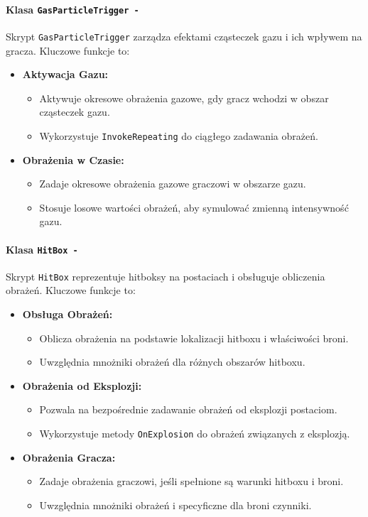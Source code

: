 \paragraph{Klasa \texttt{GasParticleTrigger -}}
Skrypt \texttt{GasParticleTrigger} zarządza efektami cząsteczek gazu i ich wpływem na gracza. Kluczowe funkcje to:
\begin{itemize}
\item \textbf{Aktywacja Gazu:}
    \begin{itemize}
        \item Aktywuje okresowe obrażenia gazowe, gdy gracz wchodzi w obszar cząsteczek gazu.
        \item Wykorzystuje \texttt{InvokeRepeating} do ciągłego zadawania obrażeń.
    \end{itemize}
\item \textbf{Obrażenia w Czasie:}
    \begin{itemize}
        \item Zadaje okresowe obrażenia gazowe graczowi w obszarze gazu.
        \item Stosuje losowe wartości obrażeń, aby symulować zmienną intensywność gazu.
    \end{itemize}
\end{itemize}

\paragraph{Klasa \texttt{HitBox -}}
Skrypt \texttt{HitBox} reprezentuje hitboksy na postaciach i obsługuje obliczenia obrażeń. Kluczowe funkcje to:
\begin{itemize}
\item \textbf{Obsługa Obrażeń:}
    \begin{itemize}
        \item Oblicza obrażenia na podstawie lokalizacji hitboxu i właściwości broni.
        \item Uwzględnia mnożniki obrażeń dla różnych obszarów hitboxu.
    \end{itemize}
\item \textbf{Obrażenia od Eksplozji:}
    \begin{itemize}
        \item Pozwala na bezpośrednie zadawanie obrażeń od eksplozji postaciom.
        \item Wykorzystuje metody \texttt{OnExplosion} do obrażeń związanych z eksplozją.
    \end{itemize}
\item \textbf{Obrażenia Gracza:}
    \begin{itemize}
        \item Zadaje obrażenia graczowi, jeśli spełnione są warunki hitboxu i broni.
        \item Uwzględnia mnożniki obrażeń i specyficzne dla broni czynniki.
    \end{itemize}
\end{itemize}

